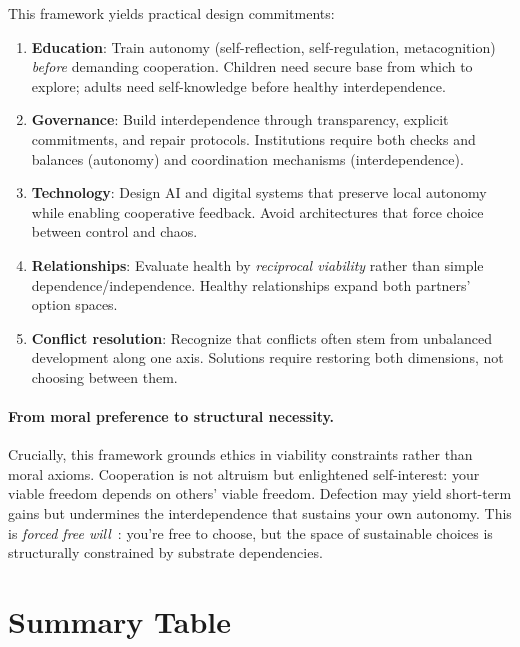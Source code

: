 \documentclass[11pt,a4paper]{article}
\begin{document}
This framework yields practical design commitments:
\begin{enumerate}
    \item \textbf{Education}: Train autonomy (self-reflection, self-regulation, metacognition) \emph{before} demanding cooperation. Children need secure base from which to explore; adults need self-knowledge before healthy interdependence.
    
    \item \textbf{Governance}: Build interdependence through transparency, explicit commitments, and repair protocols. Institutions require both checks and balances (autonomy) and coordination mechanisms (interdependence).
    
    \item \textbf{Technology}: Design AI and digital systems that preserve local autonomy while enabling cooperative feedback. Avoid architectures that force choice between control and chaos.
    
    \item \textbf{Relationships}: Evaluate health by \emph{reciprocal viability} rather than simple dependence/independence. Healthy relationships expand both partners' option spaces.
    
    \item \textbf{Conflict resolution}: Recognize that conflicts often stem from unbalanced development along one axis. Solutions require restoring both dimensions, not choosing between them.
\end{enumerate}

\paragraph{From moral preference to structural necessity.}
Crucially, this framework grounds ethics in viability constraints rather than moral axioms. Cooperation is not altruism but enlightened self-interest: your viable freedom depends on others' viable freedom. Defection may yield short-term gains but undermines the interdependence that sustains your own autonomy. This is \emph{forced free will}~\cite{ebe}: you're free to choose, but the space of sustainable choices is structurally constrained by substrate dependencies.

\section{Summary Table}
\end{document}
